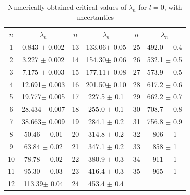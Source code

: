 \documentclass[12pt,twoside]{reedthesis}
\begin{document}
\begin{table}[h]
\centering
	\begin{tabular}{c|c||c|c||c|c}
		$n$ & $\lambda_n$ & $n$ & $\lambda_n$ & $n$ & $\lambda_n$ \\
		\hline
		1	& 0.843	$\pm$ 0.002	& 13	& 133.06$\pm$ 0.05	& 25	& 492.0	$\pm$ 0.4\\
		2	& 3.227	$\pm$ 0.002	& 14	& 154.30$\pm$ 0.06	& 26	& 532.1	$\pm$ 0.5\\
		3	& 7.175	$\pm$ 0.003	& 15	& 177.11$\pm$ 0.08	& 27	& 573.9	$\pm$ 0.5\\
		4	& 12.691$\pm$ 0.003	& 16	& 201.50$\pm$ 0.10	& 28	& 617.2	$\pm$ 0.6\\
		5	& 19.777$\pm$ 0.005	& 17	& 227.5	$\pm$ 0.1	& 29	& 662.2	$\pm$ 0.7\\
		6	& 28.434$\pm$ 0.007	& 18	& 255.0	$\pm$ 0.1	& 30	& 708.7	$\pm$ 0.8\\
		7	& 38.663$\pm$ 0.009	& 19	& 284.1	$\pm$ 0.2	& 31	& 756.8	$\pm$ 0.9\\
		8	& 50.46	$\pm$ 0.01	& 20	& 314.8	$\pm$ 0.2	& 32	& 806	$\pm$ 1\\
		9	& 63.84	$\pm$ 0.02	& 21	& 347.1	$\pm$ 0.2	& 33	& 858	$\pm$ 1\\
		10	& 78.78	$\pm$ 0.02	& 22	& 380.9	$\pm$ 0.3	& 34	& 911	$\pm$ 1\\
		11	& 95.30	$\pm$ 0.03	& 23	& 416.4	$\pm$ 0.3	& 35	& 965	$\pm$ 1\\
		12	& 113.39$\pm$ 0.04	& 24	& 453.4	$\pm$ 0.4	& 		& 
	\end{tabular}
	\caption{Numerically obtained critical values of $\lambda_n$ for $l = 0$, with uncertanties}
	\label{tab:l0}
\end{table}
\end{document}
